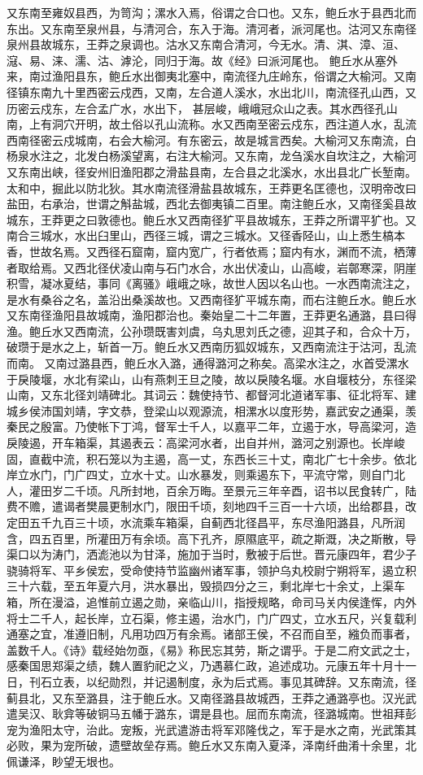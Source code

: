 \documentclass[12pt,UTF8]{ctexbook}
\begin{document}
又东南至雍奴县西，为笥沟；漯水入焉，俗谓之合口也。又东，鲍丘水于县西北而东出。又东南至泉州县，与清河合，东入于海。清河者，派河尾也。沽河又东南径泉州县故城东，王莽之泉调也。沽水又东南合清河，今无水。清、淇、漳、洹、滱、易、涞、濡、沽、滹沦，同归于海。故《经》曰派河尾也。
鲍丘水从塞外来，南过渔阳县东，鲍丘水出御夷北塞中，南流径九庄岭东，俗谓之大榆河。又南径镇东南九十里西密云戍西，又南，左合道人溪水，水出北川，南流径孔山西，又历密云戍东，左合孟广水，水出下， 甚层峻，峨峨冠众山之表。其水西径孔山南，上有洞穴开明，故土俗以孔山流称。水又西南至密云戍东，西注道人水，乱流西南径密云戍城南，右会大榆河。有东密云，故是城言西矣。大榆河又东南流，白杨泉水注之，北发白杨溪望离，右注大榆河。又东南，龙刍溪水自坎注之，大榆河又东南出峡，径安州旧渔阳郡之滑盐县南，左合县之北溪水，水出县北广长堑南。太和中，掘此以防北狄。其水南流径滑盐县故城东，王莽更名匡德也，汉明帝改曰盐田，右承治，世谓之斛盐城，西北去御夷镇二百里。南注鲍丘水，又南径奚县故城东，王莽更之曰敦德也。鲍丘水又西南径犷平县故城东，王莽之所谓平犷也。又南合三城水，水出臼里山，西径三城，谓之三城水。又径香陉山，山上悉生槁本香，世故名焉。又西径石窟南，窟内宽广，行者依焉；窟内有水，渊而不流，栖薄者取给焉。又西北径伏凌山南与石门水合，水出伏凌山，山高峻，岩鄣寒深，阴崖积雪，凝冰夏结，事同《离骚》峨峨之咏，故世人因以名山也。一水西南流注之，是水有桑谷之名，盖沿出桑溪故也。又西南径犷平城东南，而右注鲍丘水。鲍丘水又东南径渔阳县故城南，渔阳郡治也。秦始皇二十二年置，王莽更名通潞，县曰得渔。鲍丘水又西南流，公孙瓒既害刘虞，乌丸思刘氏之德，迎其子和，合众十万，破瓒于是水之上，斩首一万。鲍丘水又西南历狐奴城东，又西南流注于沽河，乱流而南。
又南过潞县西，鲍丘水入潞，通得潞河之称矣。高梁水注之，水首受漯水于戾陵堰，水北有梁山，山有燕刺王旦之陵，故以戾陵名堰。水自堰枝分，东径梁山南，又东北径刘靖碑北。其词云：魏使持节、都督河北道诸军事、征北将军、建城乡侯沛国刘靖，字文恭，登梁山以观源流，相漯水以度形势，嘉武安之通渠，羡秦民之殷富。乃使帐下丁鸿，督军士千人，以嘉平二年，立遏于水，导高梁河，造戾陵遏，开车箱渠，其遏表云：高梁河水者，出自并州，潞河之别源也。长岸峻固，直截中流，积石笼以为主遏，高一丈，东西长三十丈，南北广七十余步。依北岸立水门，门广四丈，立水十丈。山水暴发，则乘遏东下，平流守常，则自门北人，灌田岁二千顷。凡所封地，百余万晦。至景元三年辛酉，诏书以民食转广，陆费不赡，遣谒者樊晨更制水门，限田千顷，刻地四千三百一十六顷，出给郡县，改定田五千九百三十顷，水流乘车箱渠，自蓟西北径昌平，东尽渔阳潞县，凡所润含，四五百里，所灌田万有余顷。高下孔齐，原隰底平，疏之斯溉，决之斯散，导渠口以为涛门，洒滮池以为甘泽，施加于当时，敷被于后世。晋元康四年，君少子骁骑将军、平乡侯宏，受命使持节监幽州诸军事，领护乌丸校尉宁朔将军，遏立积三十六载，至五年夏六月，洪水暴出，毁损四分之三，剩北岸七十余丈，上渠车箱，所在漫溢，追惟前立遏之勋，亲临山川，指授规略，命司马关内侯逢恽，内外将士二千人，起长岸，立石渠，修主遏，治水门，门广四丈，立水五尺，兴复载利通塞之宜，准遵旧制，凡用功四万有余焉。诸部王侯，不召而自至，繈负而事者，盖数千人。《诗》载经始勿亟，《易》称民忘其劳，斯之谓乎。于是二府文武之士，感秦国思郑渠之绩，魏人置豹祀之义，乃遇慕仁政，追述成功。元康五年十月十一日，刊石立表，以纪勋烈，并记遏制度，永为后式焉。事见其碑辞。又东南流，径蓟县北，又东至潞县，注于鲍丘水。又南径潞县故城西，王莽之通潞亭也。汉光武遣吴汉、耿弇等破铜马五幡于潞东，谓是县也。屈而东南流，径潞城南。世祖拜彭宠为渔阳太守，治此。宠叛，光武遣游击将军邓隆伐之，军于是水之南，光武策其必败，果为宠所破，遗壁故垒存焉。鲍丘水又东南入夏泽，泽南纤曲淆十余里，北佩谦泽，眇望无垠也。
\end{document}
